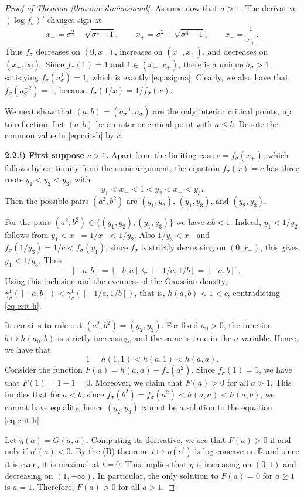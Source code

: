 \documentclass[12pt,oneside,reqno]{amsart}
\numberwithin{equation}{section}
\theoremstyle{remark}
\newcommand{\R}{\mathbb R}
\def\s{\sigma}
\begin{document}
\begin{proof}[Proof of Theorem \ref{thm:one-dimensional}]
Assume now that $\sigma>1$. The derivative $(\log f_\sigma)'$ changes sign at
\[
        x_- = \sigma^2-\sqrt{\sigma^4-1},
        \qquad
        x_+ = \sigma^2+\sqrt{\sigma^4-1},
        \qquad x_-=\frac{1}{x_+}.
\]
Thus $f_\sigma$ decreases on $(0,x_-)$, increases on $(x_-,x_+)$, and decreases on $(x_+,\infty)$. Since $f_\sigma(1)=1$ and $1\in(x_-,x_+)$, there is a unique $a_\sigma>1$ satisfying $f_\sigma(a_\sigma^2)=1$, which is exactly \eqref{eq:asigma}.
Clearly, we also have that $f_\sigma(a_\sigma^{-2})=1$, because $f_\sigma(1/x)=1/f_\sigma(x)$.

We next show that $(a,b)=(a_\s^{-1},a_\s)$ are the only interior critical points, up to reflection. Let $(a,b)$ be an interior critical point with $a\le b$. Denote the common value in \eqref{eq:crit-h} by $c$.

{\bf 2.2.i) First suppose $c>1$.} Apart from the limiting case $c=f_\sigma(x_+)$, which follows by continuity from the same argument, the equation $f_\sigma(x)=c$ has three roots $y_1<y_2<y_3$, with
\[
        y_1<x_-<1<y_2<x_+<y_3.
\]
Then the possible pairs $(a^2,b^2)$ are $(y_1,y_2)$, $(y_1,y_3)$, and $(y_2,y_3)$.

For the pairs $(a^2,b^2) \in \{(y_1,y_2),(y_1,y_3)\}$ we have $ab<1$. Indeed, $y_1<1/y_2$ follows from $y_1<x_-=1/x_+<1/y_2$. Also $1/y_3<x_-$ and $f_\sigma(1/y_3)=1/c<f_\sigma(y_1)$; since $f_\sigma$ is strictly decreasing on $(0,x_-)$, this gives $y_1<1/y_3$. Thus
\[
        -[-a,b]=[-b,a]\subsetneq[-1/a,1/b]=[-a,b]^\circ.
\]
Using this inclusion and the evenness of the Gaussian density, $\gamma_\sigma^1([-a,b])<\gamma_\sigma^1([-1/a,1/b])$, that is, $h(a,b)<1<c$, contradicting \eqref{eq:crit-h}.

It remains to rule out $(a^2,b^2)=(y_2,y_3)$. For fixed $a_0>0$, the function $b\mapsto h(a_0,b)$ is strictly increasing, and the same is true in the $a$ variable. 
Hence, we have that 
\[ 1=h(1,1)<h(a,1)<h(a,a).
\]
Consider the function $F(a)=h(a,a)-f_\sigma(a^2)$. Since $f_\sigma(1)=1$, we have that  $F(1)=1-1=0$. Moreover, we claim that $F(a)>0$ for all $a>1$. This implies that for $a<b$, since $f_\sigma(b^2)= f_\sigma(a^2) <h(a,a)<h(a,b)$, we cannot have equality, hence $(y_2,y_3)$ cannot be a solution to the equation  \eqref{eq:crit-h}.



Let $\eta(a)=G(a,a)$. Computing its derivative, we see that $F(a)>0$ if and only if $\eta'(a)<0$. By the (B)-theorem, $t\mapsto \eta(e^t)$ is log-concave on $\R$ and  since it is even, it is maximal at $t=0$. This implies that $\eta$ is increasing on $(0,1)$ and decreasing on $(1,+\infty)$. In particular, the only solution to $F(a)=0$ for $a\ge1$ is $a=1$. Therefore, 
$F(a)>0$ for all $a>1$.






\end{proof}
\end{document}
